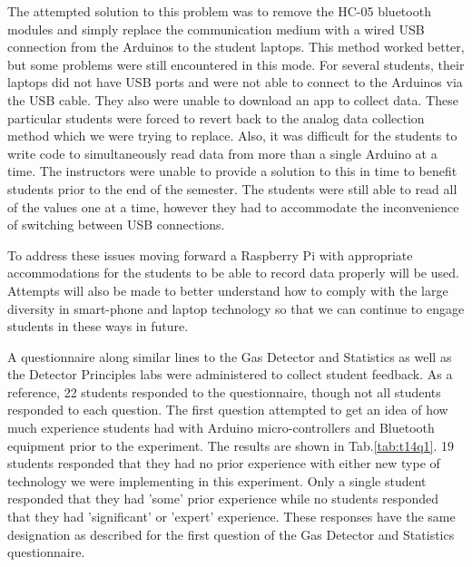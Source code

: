 The attempted solution to this problem was to remove the HC-05 bluetooth modules and simply replace the communication medium with a wired USB connection from the Arduinos to the student laptops.
This method worked better, but some problems were still encountered in this mode.
For several students, their laptops did not have USB ports and were not able to connect to the Arduinos via the USB cable.
They also were unable to download an app to collect data.
These particular students were forced to revert back to the analog data collection method which we were trying to replace.
Also, it was difficult for the students to write code to simultaneously read data from more than a single Arduino at a time.
The instructors were unable to provide a solution to this in time to benefit students prior to the end of the semester.
The students were still able to read all of the values one at a time, however they had to accommodate the inconvenience of switching between USB connections.

To address these issues moving forward a Raspberry Pi with appropriate accommodations for the students to be able to record data properly will be used.
Attempts will also be made to better understand how to comply with the large diversity in smart-phone and laptop technology so that we can continue to engage students in these ways in future.

A questionnaire along similar lines to the Gas Detector and Statistics as well as the Detector Principles labs were administered to collect student feedback.
As a reference, 22 students responded to the questionnaire, though not all students responded to each question.
The first question attempted to get an idea of how much experience students had with Arduino micro-controllers and Bluetooth equipment prior to the experiment.
The results are shown in Tab.\ref{tab:t14q1}.
19 students responded that they had no prior experience with either new type of technology we were implementing in this experiment.
Only a single student responded that they had 'some' prior experience while no students responded that they had 'significant' or 'expert' experience.
These responses have the same designation as described for the first question of the Gas Detector and Statistics questionnaire.

